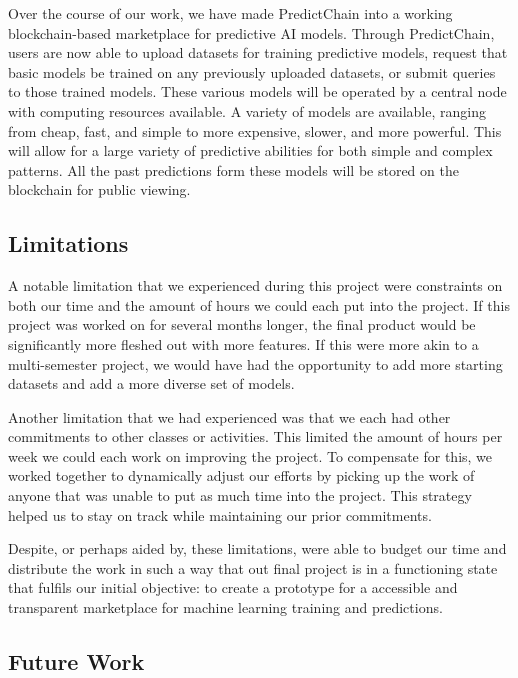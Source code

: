 \documentclass{article}
\begin{document}
    Over the course of our work, we have made PredictChain into a working blockchain-based marketplace for predictive AI models.
    Through PredictChain, users are now able to upload datasets for training predictive models, request that basic models
    be trained on any previously uploaded datasets, or submit queries to those trained models.
    These various models will be operated by a central node with computing resources available. A variety of
    models are available, ranging from cheap, fast, and simple to more expensive, slower, and more powerful.
    This will allow for a large variety of predictive abilities for both simple and complex patterns.  All the past predictions
    form these models will be stored on the blockchain for public viewing.

    \subsection{Limitations}

    A notable limitation that we experienced during this project were constraints on both our time and the amount of
    hours we could each put into the project.  If this project was worked on for several months longer, the final product
    would be significantly more fleshed out with more features.  If this were more akin to a multi-semester project,
    we would have had the opportunity to add more starting datasets and add a more diverse set of models.

    Another limitation that we had experienced was that we each had other commitments to other classes or activities.
    This limited the amount of hours per week we could each work on improving the project.  To compensate for this, we
    worked together to dynamically adjust our efforts by picking up the work of anyone that was unable to put as much
    time into the project. This strategy helped us to stay on track while maintaining our prior commitments.

    Despite, or perhaps aided by, these limitations, were able to budget our time and distribute the work in such a way
    that out final project is in a functioning state that fulfils our initial objective: to create a prototype for a
    accessible and transparent marketplace for machine learning training and predictions.

    \subsection{Future Work}
\end{document}
